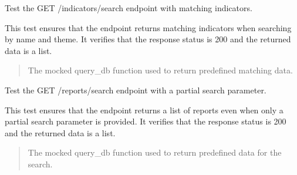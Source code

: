 \documentclass[letterpaper,10pt,english]{sphinxmanual}
\begin{document}

\begin{fulllineitems}
\label{\detokenize{test.my_fastapi:test.my_fastapi.test_main.test_search_indicators_with_name_and_theme}}
\pysigstartsignatures
\pysiglinewithargsret
{}
{}
{}
\pysigstopsignatures
\sphinxAtStartPar
Test the GET /indicators/search endpoint with matching indicators.

\sphinxAtStartPar
This test ensures that the endpoint returns matching indicators when searching by name and theme.
It verifies that the response status is 200 and the returned data is a list.
\begin{quote}\begin{description}
\sphinxAtStartPar
{} \textendash{} The mocked query\_db function used to return predefined matching data.

\end{description}\end{quote}

\end{fulllineitems}


\begin{fulllineitems}
\label{\detokenize{test.my_fastapi:test.my_fastapi.test_main.test_search_reports}}
\pysigstartsignatures
\pysiglinewithargsret
{}
{}
{}
\pysigstopsignatures
\sphinxAtStartPar
Test the GET /reports/search endpoint with a partial search parameter.

\sphinxAtStartPar
This test ensures that the endpoint returns a list of reports even when only a partial search parameter is provided.
It verifies that the response status is 200 and the returned data is a list.
\begin{quote}\begin{description}
\sphinxAtStartPar
{} \textendash{} The mocked query\_db function used to return predefined data for the search.

\end{description}\end{quote}

\end{fulllineitems}
\end{document}
